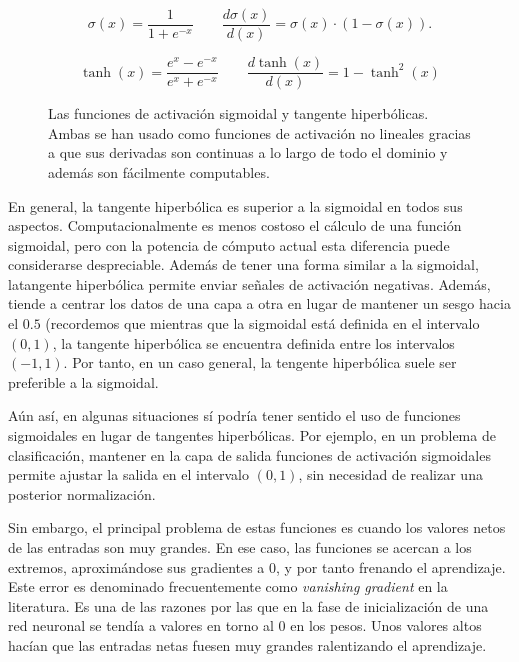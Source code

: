\begin{equation}
\sigma (x) = \frac{1}{1+e^{-x}} \qquad
\frac{d\sigma (x)}{d(x)} = \sigma (x)\cdot (1-\sigma(x)).
\label{eq:sigmoid}
\end{equation}

\begin{equation}
\tanh(x) = \frac{e^x - e^{-x}}{e^x+e^{-x}} \qquad
\frac{d\tanh (x)}{d(x)} = 1 - \tanh^2(x)
\label{eq:tanh}
\end{equation}

\begin{figure}
	\centering
	\qquad
	\caption[Funciones de activación: sigmoidal y tangente hiperbólica.]{Las funciones de activación sigmoidal y tangente hiperbólicas. Ambas se han usado como funciones de activación no lineales gracias a que sus derivadas son continuas a lo largo de todo el dominio y además son fácilmente computables.}
	\label{fig:sig-and-tanh}
\end{figure}

En general, la tangente hiperbólica es superior a la sigmoidal en todos sus aspectos. Computacionalmente es menos costoso el cálculo de una función sigmoidal, pero con la potencia de cómputo actual esta diferencia puede considerarse despreciable. Además de tener una forma similar a la sigmoidal, latangente hiperbólica permite enviar señales de activación negativas. Además, tiende a centrar los datos de una capa a otra en lugar de mantener un sesgo hacia el $0.5$ (recordemos que mientras que la sigmoidal está definida en el intervalo $(0, 1)$, la tangente hiperbólica se encuentra definida entre los intervalos $(-1, 1)$. Por tanto, en un caso general, la tengente hiperbólica suele ser preferible a la sigmoidal.

Aún así, en algunas situaciones sí podría tener sentido el uso de funciones sigmoidales en lugar de tangentes hiperbólicas. Por ejemplo, en un problema de clasificación, mantener en la capa de salida funciones de activación sigmoidales permite ajustar la salida en el intervalo $(0, 1)$, sin necesidad de realizar una posterior normalización.

Sin embargo, el principal problema de estas funciones es cuando los valores netos de las entradas son muy grandes. En ese caso, las funciones se acercan a los extremos, aproximándose sus gradientes a 0, y por tanto frenando el aprendizaje. Este error es denominado frecuentemente como \textit{vanishing gradient} en la literatura. Es una de las razones por las que en la fase de inicialización de una red neuronal se tendía a valores en torno al 0 en los pesos. Unos valores altos hacían que las entradas netas fuesen muy grandes ralentizando el aprendizaje.

